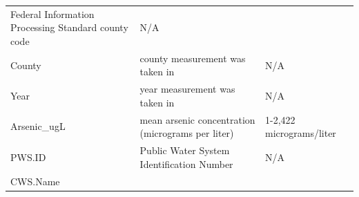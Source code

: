 \documentclass[12pt,]{article}
\begin{document}
\begin{longtable}[]{@{}lll@{}}
\begin{minipage}[t]{0.46\columnwidth}
Federal Information Processing Standard county code\strut
\end{minipage} & \begin{minipage}[t]{0.23\columnwidth}\raggedright
N/A\strut
\end{minipage}\tabularnewline
\begin{minipage}[t]{0.22\columnwidth}\raggedright
County\strut
\end{minipage} & \begin{minipage}[t]{0.46\columnwidth}\raggedright
county measurement was taken in\strut
\end{minipage} & \begin{minipage}[t]{0.23\columnwidth}\raggedright
N/A\strut
\end{minipage}\tabularnewline
\begin{minipage}[t]{0.22\columnwidth}\raggedright
Year\strut
\end{minipage} & \begin{minipage}[t]{0.46\columnwidth}\raggedright
year measurement was taken in\strut
\end{minipage} & \begin{minipage}[t]{0.23\columnwidth}\raggedright
N/A\strut
\end{minipage}\tabularnewline
\begin{minipage}[t]{0.22\columnwidth}\raggedright
Arsenic\_ugL\strut
\end{minipage} & \begin{minipage}[t]{0.46\columnwidth}\raggedright
mean arsenic concentration (micrograms per liter)\strut
\end{minipage} & \begin{minipage}[t]{0.23\columnwidth}\raggedright
1-2,422 micrograms/liter\strut
\end{minipage}\tabularnewline
\begin{minipage}[t]{0.22\columnwidth}\raggedright
PWS.ID\strut
\end{minipage} & \begin{minipage}[t]{0.46\columnwidth}\raggedright
Public Water System Identification Number\strut
\end{minipage} & \begin{minipage}[t]{0.23\columnwidth}\raggedright
N/A\strut
\end{minipage}\tabularnewline
\begin{minipage}[t]{0.22\columnwidth}\raggedright
CWS.Name\strut
\end{minipage} & \begin{minipage}[t]{0.46\columnwidth}\raggedright

\end{minipage}
\end{longtable}
\end{document}
